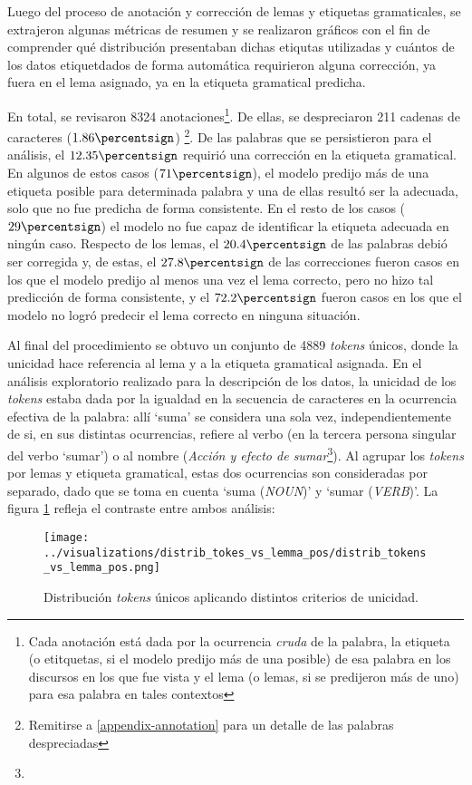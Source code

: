 Luego del proceso de anotación y corrección de lemas y etiquetas gramaticales,
se extrajeron algunas métricas de resumen y se realizaron gráficos con el fin de
comprender qué distribución presentaban dichas etiqutas utilizadas y cuántos de los
datos etiquetdados de forma automática requirieron alguna corrección, ya fuera en el
lema asignado, ya en la etiqueta gramatical predicha.
\par
En total, se revisaron 8324 anotaciones\footnote{Cada anotación está dada por
la ocurrencia \textit{cruda} de la palabra, la etiqueta (o etitquetas, si el modelo
predijo más de una posible) de esa palabra en los discursos en los que fue vista y el
lema (o lemas, si se predijeron más de uno) para esa palabra en tales contextos}.
De ellas, se despreciaron 211 cadenas de caracteres ($1.86\percentsign$)
\footnote{Remitirse a \ref{appendix-annotation} para un detalle de las palabras
despreciadas}. De las palabras que se persistieron para el análisis,
el $12.35\percentsign$ requirió una corrección en la etiqueta gramatical.
En algunos de estos casos ($71\percentsign$), el modelo predijo más de una etiqueta
posible para determinada palabra y una de ellas resultó ser la adecuada, solo que no
fue predicha de forma consistente. En el resto de los casos ($29\percentsign$)
el modelo no fue capaz de identificar la etiqueta adecuada en ningún caso.
Respecto de los lemas, el $20.4\percentsign$ de las palabras debió ser corregida
y, de estas, el $27.8\percentsign$ de las correcciones fueron casos en los que el
modelo predijo al menos una vez el lema correcto, pero no hizo tal predicción de
forma consistente, y el $72.2\percentsign$ fueron casos en los que el modelo
no logró predecir el lema correcto en ninguna situación.
\par
Al final del procedimiento se obtuvo un conjunto de 4889 \textit{tokens} únicos,
donde la unicidad hace referencia al lema y a la etiqueta gramatical asignada.
En el análisis exploratorio realizado para la descripción de los datos, la unicidad
de los \textit{tokens} estaba dada por la igualdad en la secuencia de caracteres
en la ocurrencia efectiva de la palabra: allí `suma' se considera
una sola vez, independientemente de si, en sus distintas ocurrencias, refiere al
verbo (en la tercera persona singular del verbo `sumar') o al nombre
(\textit{Acción y efecto de sumar}\footnote{}). Al
agrupar los \textit{tokens} por lemas y etiqueta gramatical, estas dos
ocurrencias son consideradas por separado, dado que se toma en cuenta
`suma (\textit{NOUN})' y `sumar (\textit{VERB})'. La figura
\ref{fig-distrib-unique-tokens} refleja el contraste entre ambos análisis:

\begin{figure}[h!]
\centering
\texttt{[image: ../visualizations/distrib\_tokes\_vs\_lemma\_pos/distrib\_tokens\_vs\_lemma\_pos.png]}
\caption{Distribución \textit{tokens} únicos aplicando distintos criterios de unicidad.}
\label{fig-distrib-unique-tokens}
\end{figure}